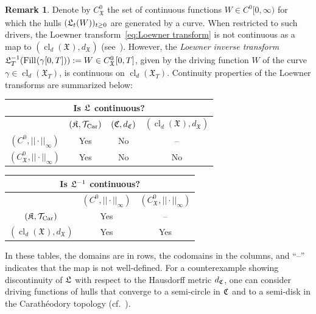 \documentclass[a4paper, 11pt]{article}
\theoremstyle{definition}
\newtheorem{remark}[thm]{Remark}
\numberwithin{equation}{section}
\numberwithin{figure}{section}
\newcommand{\LLoewnerTransform}[1][]{\mathfrak{L}_{\ifx&#1&\else#1\fi}}
\newcommand{\funs}[2][]{C^{0}_{#1}[0,#2}
\newcommand{\funsNodom}[1]{C^{0}_{#1}}
\newcommand{\filling}[2][]{\mathrm{Fill}_{#1}(#2)}
\newcommand{\Khulls}[1][]{\mathfrak{K}_{#1}}
\newcommand{\Xpaths}[1][]{\mathfrak{X}_{#1}}
\newcommand{\Xpathscl}[1][]{\operatorname{cl}_{d}(\Xpaths[#1])}
\newcommand{\dCcompsets}{d_{\Ccompsets}}
\newcommand{\norm}[1]{|\!|#1|\!|}
\newcommand{\normUniform}[1]{\norm{#1}_\infty}
\newcommand{\dXpaths}[1][]{d_{\Xpaths[#1]}}
\begin{document}
\begin{remark}\label{rem:continuity-properties-of-loewner-transform} 
Denote by $\funsNodom{\Xpaths}$ the set of continuous functions $W \in \funs{\infty)}$ 
for which the hulls $(\LLoewnerTransform[t](W))_{t \ge 0}$ are generated by a curve. 
When restricted to such drivers, 
the Loewner transform~\eqref{eq:Loewner transform} is not continuous as a map 
to $(\Xpathscl,\dXpaths)$ 
(see~\cite[Lemma~6.3]{Kemppainen:SLE_book}). 
However, the \emph{Loewner inverse transform} 
$\LLoewnerTransform[T]^{-1}(\filling{\gamma[0,T]}) := W \in \funs[\Xpaths]{T]}$, 
given by the driving function $W$ of the curve $\gamma \in \Xpathscl[T]$, is continuous on $\Xpathscl[T]$. 
Continuity properties of the Loewner transforms are summarized below: 
\begin{center}
\hspace*{-2mm}
\begin{tabular}{cccc}
\multicolumn{4}{c}{Is $\LLoewnerTransform$ continuous?}                                                                                            \\ \hline
\multicolumn{1}{|c|}{}                  & \multicolumn{1}{c|}{$(\Khulls, \cT_{\textnormal{Car}})$} & \multicolumn{1}{c|}{$(\Ccompsets,\dCcompsets)$} & \multicolumn{1}{c|}{$(\Xpathscl,\dXpaths)$} \\ \hline
\multicolumn{1}{|c|}{$(\funsNodom{},\normUniform{\cdot})$}           & \multicolumn{1}{c|}{Yes}         & \multicolumn{1}{c|}{No}             & \multicolumn{1}{c|}{--}           \\ \hline
\multicolumn{1}{|c|}{$(\funsNodom{\Xpaths},\normUniform{\cdot})$} & \multicolumn{1}{c|}{Yes}         & \multicolumn{1}{c|}{No}             & \multicolumn{1}{c|}{No}           \\ \hline
\end{tabular}
\begin{tabular}{ccc}
\multicolumn{3}{c}{Is $\LLoewnerTransform^{-1}$ continuous?}                                              \\ \hline
\multicolumn{1}{|c|}{}              & \multicolumn{1}{c|}{$(\funsNodom{},\normUniform{\cdot})$} & \multicolumn{1}{c|}{$(\funsNodom{\Xpaths},\normUniform{\cdot})$} \\ \hline
\multicolumn{1}{|c|}{$(\Khulls, \cT_{\textnormal{Car}})$}   & \multicolumn{1}{c|}{Yes}      & \multicolumn{1}{c|}{--}                 \\ \hline
\multicolumn{1}{|c|}{$(\Xpathscl,\dXpaths)$} & \multicolumn{1}{c|}{Yes}      & \multicolumn{1}{c|}{Yes}                \\ \hline
\end{tabular} 
\end{center}
In these tables, the domains are in rows, the codomains in the columns, 
and ``--'' indicates that the map is not well-defined. 
For a counterexample showing discontinuity of $\LLoewnerTransform$ with respect to the Hausdorff metric $\dCcompsets$, one can consider driving functions of hulls that converge to a semi-circle in $\mathfrak{C}$ and to a semi-disk in the Carath\'eodory topology (cf.~\cite[Section~2]{Peltola-Wang:LDP}).
\end{remark}
\end{document}
